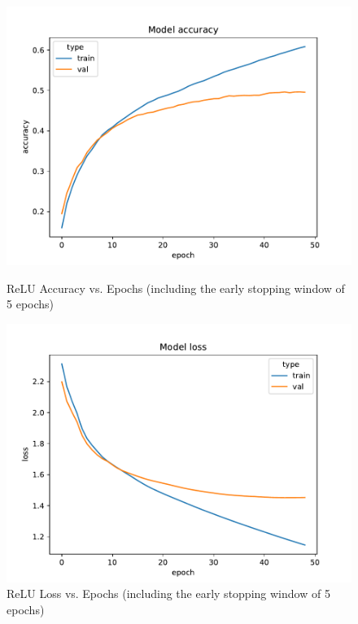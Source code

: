 \documentclass{article}
\begin{document}
    \begin{figure}[H]
        \begin{minipage}[b]{0.5\linewidth}
            \centering
            \includegraphics[width=\textwidth]{../plots/config_2e_ReLU_accuracy}
            \caption{ReLU Accuracy vs. Epochs (including the early stopping window of 5 epochs)}
            \label{fig:figure11}
        \end{minipage}
        \hspace{0.2cm}
        \begin{minipage}[b]{0.5\linewidth}
            \centering
            \includegraphics[width=\textwidth]{../plots/config_2e_ReLU_loss}
            \caption{ReLU Loss vs. Epochs (including the early stopping window of 5 epochs)}
            \label{fig:figure12}
        \end{minipage}
    \end{figure}
\end{document}
